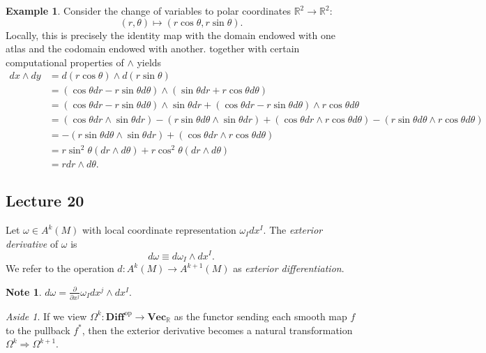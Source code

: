 \documentclass[10pt,letterpaper,cm]{nupset}
\theoremstyle{definition}
\newtheorem{exmp}[definition]{Example}
\newtheorem{note}[definition]{Note}
\theoremstyle{theorem}
\theoremstyle{remark}
\newtheorem*{aside}{Aside}
\newcommand{\R}{\mathbb R}
\newcommand{\1}{\mathbf{1}}
\newcommand{\0}{\vec 0}
\begin{document}
\begin{exmp}
Consider the change of variables to polar coordinates $\R^2 \to \R^2$: $$\left(r, \theta\right) \mapsto \left(r\cos \theta, r\sin \theta\right).$$ Locally, this is precisely the identity map with the domain endowed with one atlas and the codomain endowed with another.  together with certain computational properties of $\wedge$ yields
\begin{align*}  dx \wedge dy & = d(r\cos \theta) \wedge d(r\sin \theta) \\ &=   \left(\cos \theta dr - r\sin \theta d\theta\right) \wedge \left(\sin \theta dr +r \cos \theta d\theta\right) \\ &= \left(\cos \theta dr - r\sin \theta d\theta\right) \wedge \sin \theta dr + \left(\cos \theta dr - r\sin \theta d\theta\right) \wedge r \cos \theta d\theta \\ & = \left(\cos \theta dr \wedge \sin \theta dr\right) - \left(r \sin \theta d \theta \wedge \sin \theta dr\right) +  \left(\cos \theta dr \wedge r \cos \theta d\theta\right) - \left(r\sin \theta d \theta \wedge r \cos \theta d \theta\right)\\ & =  {-\left(r \sin \theta d \theta \wedge \sin \theta dr\right)} +  \left(\cos \theta dr \wedge r \cos \theta d\theta\right) \\ & = r\sin^2\theta(dr \wedge d\theta) + r\cos^2 \theta(dr \wedge d\theta)\\ & = rdr \wedge d\theta.
\end{align*}
\end{exmp}

\subsection{Lecture 20}

Let $\omega \in A^k(M)$ with local coordinate representation $\omega_I dx^I$. The \textit{exterior derivative} of $\omega$ is $$d\omega \equiv d \omega_I \wedge dx^I.$$ We refer to the operation $d : A^k(M) \to A^{k+1}(M)$ as \textit{exterior differentiation}.


\begin{note}
$d \omega = \frac{\partial}{\partial{x^j}}\omega_I dx^j \wedge dx^I.$
\end{note}

\begin{aside}
If we view $\Omega^k : \mathbf{Diff}^{\text{op}} \to \mathbf{Vec}_{\R}$ as the functor sending each smooth map $f$ to the pullback $f^{\ast}$, then the exterior derivative becomes a natural transformation $\Omega^k \Rightarrow \Omega^{k+1}$.  
\end{aside}
\end{document}
